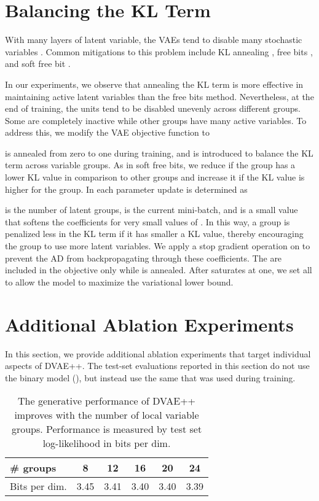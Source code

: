 \documentclass{article}
\begin{document}
\section{Balancing the KL Term} \label{app:KLBalance}

With many layers of latent variable, the VAEs tend to disable many stochastic variables \cite{bowman2016generating, sonderby2016ladder}. Common mitigations
to this problem include KL annealing \cite{sonderby2016ladder}, free bits \cite{kingma2016improved}, and soft free bit \cite{chen2016variational}. 

In our experiments, we observe that annealing the KL term is more effective in maintaining active latent
variables than the free bits method. Nevertheless, at the end of training, the units tend to be
disabled unevenly across different groups. Some are completely inactive while other groups have many active variables. To address this, 
we modify the VAE objective function to

 is annealed from zero to one during training, and  is introduced to balance the KL term across variable groups. 
As in soft free bits,
we reduce  if the  group has a lower KL value in comparison to other groups and increase it if the KL value is higher for the group. 
In each parameter update  is determined as

 is the number of latent groups,  is the current mini-batch, and  is a small value that softens the coefficients for very small values of . 
In this way, a group is penalized less in the KL term
if it has smaller a KL value, thereby encouraging the group to use more latent variables. We apply a stop gradient operation on  to prevent the AD from 
backpropagating through these coefficients. The  are included in the objective only while  is annealed. After   saturates at one, we set all  to allow the model to maximize the variational lower bound.  

\section{Additional Ablation Experiments}  \label{app:ablation}

In this section, we provide additional ablation experiments that target individual aspects of DVAE++. The test-set evaluations reported in this section do not use the binary model (), but instead use the same  that was used during training.
\begin{table} 
\centering
  \caption{The generative performance of DVAE++ improves with the number of local variable groups. 
  Performance is measured by test set log-likelihood in bits per dim.}
\begin{tabular}{ l|c|c|c|c|c}    \# groups              &  8 & 12 & 16 & 20 & 24 \\
\hline
Bits per dim.          & 3.45 & 3.41 & 3.40 & 3.40 &  3.39 \\
\end{tabular} \label{tab:num_layer_expr}
\end{table}
\end{document}
